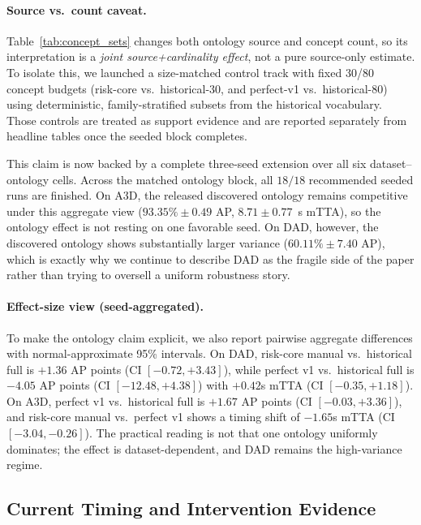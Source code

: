 \paragraph{Source vs.\ count caveat.}
Table~\ref{tab:concept_sets} changes both ontology source and concept count, so
its interpretation is a \emph{joint source+cardinality effect}, not a pure
source-only estimate. To isolate this, we launched a size-matched control track
with fixed 30/80 concept budgets (risk-core vs.\ historical-30, and perfect-v1
vs.\ historical-80) using deterministic, family-stratified subsets from the
historical vocabulary. Those controls are treated as support evidence and are
reported separately from headline tables once the seeded block completes.

This claim is now backed by a complete three-seed extension over all six
dataset--ontology cells. Across the matched ontology block, all $18/18$
recommended seeded runs are finished. On A3D, the released discovered
ontology remains competitive under this aggregate view
($93.35\%\pm0.49$ AP, $8.71\pm0.77$~s mTTA), so the ontology effect is not
resting on one favorable seed. On DAD, however, the discovered ontology shows
substantially larger variance ($60.11\%\pm7.40$ AP), which is exactly why we
continue to describe DAD as the fragile side of the paper rather than trying
to oversell a uniform robustness story.

\paragraph{Effect-size view (seed-aggregated).}
To make the ontology claim explicit, we also report pairwise aggregate
differences with normal-approximate 95\% intervals. On DAD, risk-core manual
vs.\ historical full is $+1.36$ AP points (CI $[-0.72, +3.43]$), while perfect
v1 vs.\ historical full is $-4.05$ AP points (CI $[-12.48, +4.38]$) with
$+0.42$s mTTA (CI $[-0.35, +1.18]$). On A3D, perfect v1 vs.\ historical full
is $+1.67$ AP points (CI $[-0.03, +3.36]$), and risk-core manual vs.\ perfect
v1 shows a timing shift of $-1.65$s mTTA (CI $[-3.04, -0.26]$). The practical
reading is not that one ontology uniformly dominates; the effect is
dataset-dependent, and DAD remains the high-variance regime.

\subsection{Current Timing and Intervention Evidence}

